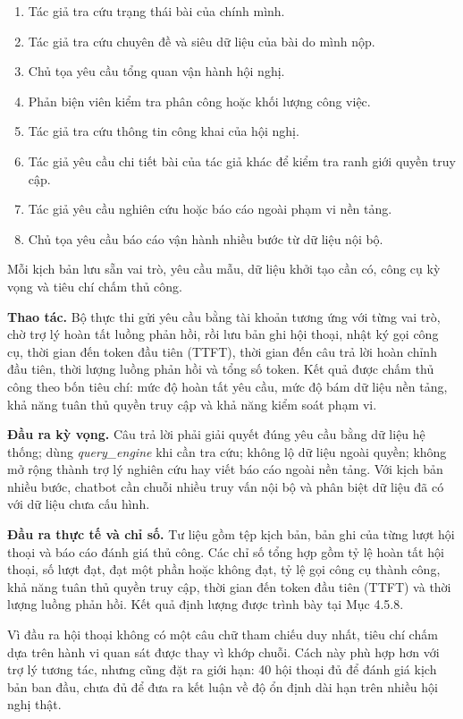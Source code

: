 \begin{enumerate}
  \item Tác giả tra cứu trạng thái bài của chính mình.
  \item Tác giả tra cứu chuyên đề và siêu dữ liệu của bài do mình nộp.
  \item Chủ tọa yêu cầu tổng quan vận hành hội nghị.
  \item Phản biện viên kiểm tra phân công hoặc khối lượng công việc.
  \item Tác giả tra cứu thông tin công khai của hội nghị.
  \item Tác giả yêu cầu chi tiết bài của tác giả khác để kiểm tra ranh giới quyền truy cập.
  \item Tác giả yêu cầu nghiên cứu hoặc báo cáo ngoài phạm vi nền tảng.
  \item Chủ tọa yêu cầu báo cáo vận hành nhiều bước từ dữ liệu nội bộ.
\end{enumerate}

Mỗi kịch bản lưu sẵn vai trò, yêu cầu mẫu, dữ liệu khởi tạo cần có, công cụ kỳ vọng và tiêu chí chấm thủ công.

\textbf{Thao tác.} Bộ thực thi gửi yêu cầu bằng tài khoản tương ứng với từng vai trò, chờ trợ lý hoàn tất luồng phản hồi, rồi lưu bản ghi hội thoại, nhật ký gọi công cụ, thời gian đến token đầu tiên (TTFT), thời gian đến câu trả lời hoàn chỉnh đầu tiên, thời lượng luồng phản hồi và tổng số token. Kết quả được chấm thủ công theo bốn tiêu chí: mức độ hoàn tất yêu cầu, mức độ bám dữ liệu nền tảng, khả năng tuân thủ quyền truy cập và khả năng kiểm soát phạm vi.

\textbf{Đầu ra kỳ vọng.} Câu trả lời phải giải quyết đúng yêu cầu bằng dữ liệu hệ thống; dùng \textit{query\_engine} khi cần tra cứu; không lộ dữ liệu ngoài quyền; không mở rộng thành trợ lý nghiên cứu hay viết báo cáo ngoài nền tảng. Với kịch bản nhiều bước, chatbot cần chuỗi nhiều truy vấn nội bộ và phân biệt dữ liệu đã có với dữ liệu chưa cấu hình.

\textbf{Đầu ra thực tế và chỉ số.} Tư liệu gồm tệp kịch bản, bản ghi của từng lượt hội thoại và báo cáo đánh giá thủ công. Các chỉ số tổng hợp gồm tỷ lệ hoàn tất hội thoại, số lượt đạt, đạt một phần hoặc không đạt, tỷ lệ gọi công cụ thành công, khả năng tuân thủ quyền truy cập, thời gian đến token đầu tiên (TTFT) và thời lượng luồng phản hồi. Kết quả định lượng được trình bày tại Mục 4.5.8.

Vì đầu ra hội thoại không có một câu chữ tham chiếu duy nhất, tiêu chí chấm dựa trên hành vi quan sát được thay vì khớp chuỗi. Cách này phù hợp hơn với trợ lý tương tác, nhưng cũng đặt ra giới hạn: 40 hội thoại đủ để đánh giá kịch bản ban đầu, chưa đủ để đưa ra kết luận về độ ổn định dài hạn trên nhiều hội nghị thật.

